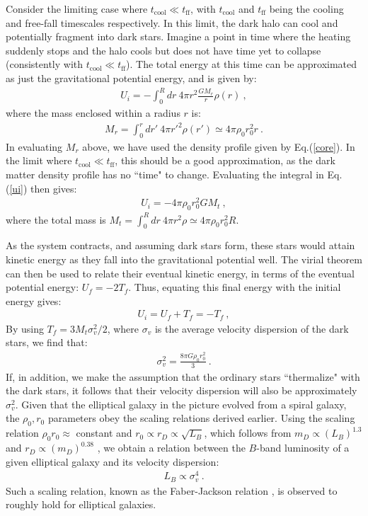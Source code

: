 \documentclass[12pt]{article}
\begin{document}
{{Consider the limiting case where $t _{\text{cool}} \ll t _{\text{ff}}$,
with $t _{\text{cool}}$ and $t _{\text{ff}}$ being the cooling and
free-fall timescales respectively. In this limit, the dark halo can cool
and potentially fragment into dark stars. Imagine a point in time where
the heating suddenly stops and the halo cools but does not have time yet
to collapse (consistently with $t _{\text{cool}} \ll t _{\text{ff}}$).
The total energy at this time can be approximated as just the
gravitational potential energy, and is given by:
%
\begin{eqnarray}
U _i = -\int _0 ^R dr \ 4\pi r^2 \frac{GM_r}{r}\rho (r) \ ,
\label{ui}
\end{eqnarray}
%
where the mass enclosed within a radius $r$ is:
%
\begin{eqnarray}
M_r = \int _0 ^r dr' \ 4\pi {r'} ^2\rho (r') \simeq 4\pi \rho _0r _0 ^2
r \ .
\end{eqnarray}
%
In evaluating $M_r$ above, we have used the density profile given by
Eq.(\ref{core}).  In the limit where $t _{\text{cool}} \ll t
_{\text{ff}}$, this should be a good approximation, as the dark matter
density profile has no ``time" to change. Evaluating the integral in
Eq.(\ref{ui}) then gives:
%
\begin{eqnarray}
U _i = -4\pi \rho _0r _0 ^2 GM _t \ ,
\end{eqnarray}
%
where the total mass is $M _t = \int _0 ^R dr \ 4\pi r ^2 \rho \simeq
4\pi \rho _0r _0 ^2R$. 

As the system contracts, and assuming dark stars form, these stars would
attain kinetic energy as they fall into the gravitational potential
well. The virial theorem can then be used to relate their eventual
kinetic energy, in terms of the eventual potential energy: $U _f = -2T
_f$. Thus, equating this final energy with the initial energy gives:
%
\begin{eqnarray}
U _i = U _f + T _f = -T _f \ ,
\end{eqnarray}
%
By using $T _f = 3M _t\sigma _v ^2/2$, where $\sigma_v$ is the average
velocity dispersion of the dark stars, we find that:
\begin{eqnarray}
\sigma _v ^2 = \frac{8\pi G\rho _0r _0 ^2}{3} \ .
\end{eqnarray}
%
If, in addition, we make the assumption that the ordinary stars
``thermalize" with the dark stars, it follows that their velocity
dispersion will also be approximately $\sigma _v ^2$. Given that the
elliptical galaxy in the picture evolved from a spiral galaxy, the
$\rho_0, r_0$ parameters obey the scaling relations derived earlier.
Using the scaling relation $\rho _0r _0 \approx$ constant and $r _0
\propto r _D \propto \sqrt{L _B}$, which follows from $m _D \propto
\left ( L _B \right ) ^{1.3}$ \cite{shankar} and $r_D \propto \left ( m
_D \right ) ^{0.38}$ \cite{saluccird}, we obtain a relation between the
$B$-band luminosity of a given elliptical galaxy and its velocity
dispersion:
%
\begin{eqnarray}
L _B \propto \sigma _v ^4 \ .
\end{eqnarray}
%
Such a scaling relation, known as the Faber-Jackson relation
\cite{faberjackson}, is observed to roughly hold for elliptical
galaxies.

}}
\end{document}
